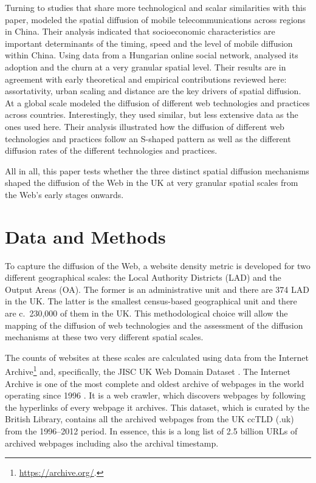 \documentclass[
  authoryear,
  preprint,
  3p]{elsarticle}
\begin{document}
Turning to studies that share more technological and scalar similarities
with this paper, \citet{ding2010modeling} modeled the spatial diffusion
of mobile telecommunications across regions in China. Their analysis
indicated that socioeconomic characteristics are important determinants
of the timing, speed and the level of mobile diffusion within China.
Using data from a Hungarian online social network,
\citet{lengyel2020role} analysed its adoption and the churn at a very
granular spatial level. Their results are in agreement with early
theoretical and empirical contributions reviewed here: assortativity,
urban scaling and distance are the key drivers of spatial diffusion. At
a global scale \citet{PAPAGIANNIDIS2015308} modeled the diffusion of
different web technologies and practices across countries.
Interestingly, they used similar, but less extensive data as the ones
used here. Their analysis illustrated how the diffusion of different web
technologies and practices follow an S-shaped pattern as well as the
different diffusion rates of the different technologies and practices.

All in all, this paper tests whether the three distinct spatial
diffusion mechanisms shaped the diffusion of the Web in the UK at very
granular spatial scales from the Web's early stages onwards.

\section{Data and Methods}\label{sec-datamethods}

To capture the diffusion of the Web, a website density metric is
developed for two different geographical scales: the Local Authority
Districts (LAD) and the Output Areas (OA). The former is an
administrative unit and there are 374 LAD in the UK. The latter is the
smallest census-based geographical unit and there are c.~230,000 of them
in the UK. This methodological choice will allow the mapping of the
diffusion of web technologies and the assessment of the diffusion
mechanisms at these two very different spatial scales.

The counts of websites at these scales are calculated using data from
the Internet Archive\footnote{\href{See\%20https://archive.org/}{https://archive.org/}.}
and, specifically, the JISC UK Web Domain Dataset \citep{ukwebarchive}.
The Internet Archive is one of the most complete and oldest archive of
webpages in the world operating since 1996
\citep{ainsworth2011much, holzmann2016dawn}. It is a web crawler, which
discovers webpages by following the hyperlinks of every webpage it
archives. This dataset, which is curated by the British Library,
contains all the archived webpages from the UK ccTLD (.uk) from the
1996--2012 period. In essence, this is a long list of 2.5 billion URLs
of archived webpages including also the archival timestamp.
\end{document}

